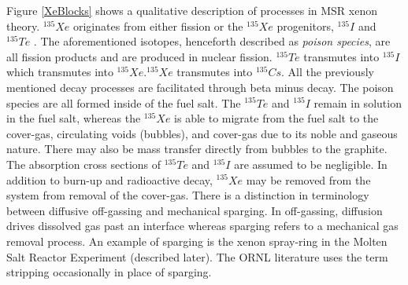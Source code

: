 Figure \ref{XeBlocks} shows a qualitative description of processes in MSR xenon theory. $^{135}Xe$  originates from either fission or the $^{135}Xe$  progenitors, $^{135}I$  and $^{135}Te$ . The aforementioned isotopes, henceforth described as \textit{poison species},  are all fission products and are produced in nuclear fission. $^{135}Te$ transmutes into  $^{135}I$ which transmutes into  $^{135}Xe$.$^{135}Xe$  transmutes into $^{135}Cs$. All the previously mentioned decay processes are facilitated through beta minus decay.  The poison species are all formed inside of the fuel salt.  The  $^{135}Te$ and  $^{135}I$ remain in solution in the fuel salt, whereas the  $^{135}Xe$ is able to migrate from the fuel salt to the cover-gas, circulating voids (bubbles), and cover-gas due to its noble and gaseous nature. There may also be mass transfer directly from bubbles to the graphite.  The absorption cross sections of  $^{135}Te$ and  $^{135}I$ are assumed to be negligible.  In addition to burn-up and radioactive decay,  $^{135}Xe$ may be removed from the system from removal of the cover-gas.  There is a distinction in terminology between diffusive off-gassing and mechanical sparging.  In off-gassing, diffusion drives dissolved gas past an interface whereas sparging refers to a mechanical gas removal process. An example of sparging is the xenon spray-ring in the Molten Salt Reactor Experiment (described later).  The ORNL literature uses the term stripping occasionally in place of sparging.

